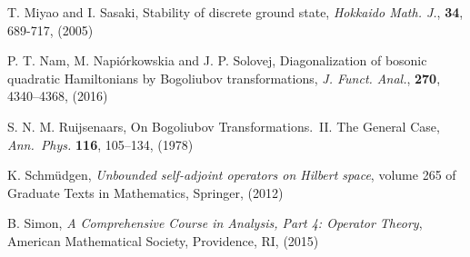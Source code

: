 \documentclass[12pt]{article}
\theoremstyle{plain}
\numberwithin{equation}{section}
\theoremstyle{remark}
\begin{document}
{\begin{thebibliography}{00}
  {T. Miyao and I. Sasaki},
  {Stability of discrete ground state}, 
  \textit{Hokkaido Math. J.}, \textbf{34}, 689-717, (2005)

 {P. T. Nam, M. Napi\'{o}rkowskia and J. P. Solovej},
 {Diagonalization of bosonic quadratic Hamiltonians by Bogoliubov transformations},
 \textit{J. Funct. Anal.}, \textbf{270}, 4340--4368, (2016)

  {S. N. M. Ruijsenaars},
  {On Bogoliubov Transformations.\ II. The General Case}, 
  \textit{Ann.\ Phys.} \textbf{116}, {105--134}, (1978)

  {K. Schm\"udgen},
  \textit{Unbounded self-adjoint operators on Hilbert space}, 
  volume 265 of Graduate Texts in Mathematics, Springer, (2012)

 {B. Simon},
 \textit{A Comprehensive Course in Analysis, Part 4: Operator Theory}, 
 American Mathematical Society, Providence, RI, (2015)
\end{thebibliography}
}

\end{document}
